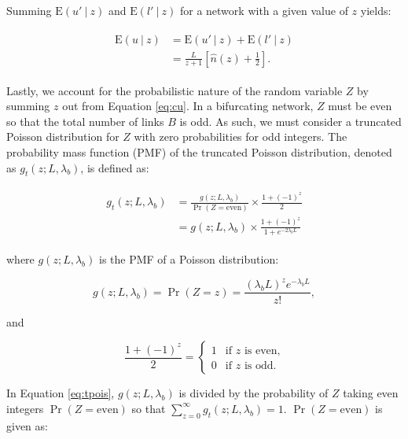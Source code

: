 \documentclass[11pt, class=article, crop=false]{standalone}
\begin{document}
Summing $\mbox{E}(u' ~|~ z)$ and $\mbox{E}(l'~|~z)$ for a network with a given value of $z$ yields:

\begin{align}
    \begin{split}
        \mbox{E}(u ~|~ z) &= \mbox{E}(u' ~|~ z) + \mbox{E}(l'~|~z)\\
                          &= \frac{L}{z+1} \left[ \hat{n}(z) + \frac{1}{2} \right].
    \end{split}
    \label{eq:cu}
\end{align}

Lastly, we account for the probabilistic nature of the random variable $Z$ by summing $z$ out from Equation \ref{eq:cu}.
In a bifurcating network, $Z$ must be even so that the total number of links $B$ is odd.
As such, we must consider a truncated Poisson distribution for $Z$ with zero probabilities for odd integers.
The probability mass function (PMF) of the truncated Poisson distribution, denoted as $g_{t}(z; L, \lambda_b)$, is defined as:

\begin{align}
    \begin{split}
    g_{t}(z; L, \lambda_b) &= \frac{g(z; L, \lambda_b)}{\Pr(Z = \text{even})} \times \frac{1 + (-1)^{z}}{2}\\
                           &= g(z; L, \lambda_b) \times \frac{1 + (-1)^{z}}{1 + e^{-2\lambda_b L}}
    \end{split}
    \label{eq:tpois}
\end{align}

where $g(z; L, \lambda_b)$ is the PMF of a Poisson distribution:

\begin{equation}
    g(z; L, \lambda_b) = \Pr(Z = z) = \frac{(\lambda_b L)^{z} e^{-\lambda_b L}}{z!},
\end{equation}

and

\begin{equation}
    \frac{1 + (-1)^{z}}{2} =
    \begin{cases}
        1 & \text{if $z$ is even,}\\
        0 & \text{if $z$ is odd.}
    \end{cases}
\end{equation}

In Equation \ref{eq:tpois}, $g(z; L, \lambda_b)$ is divided by the probability of $Z$ taking even integers $\Pr(Z = \text{even})$ so that $\sum_{z=0}^{\infty} g_t(z; L, \lambda_b) = 1$.
$\Pr(Z = \text{even})$ is given as:
\end{document}
